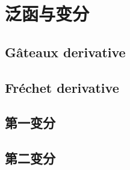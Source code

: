 \section{泛函与变分}
\label{b2:sec:1401}


\subsection{Gâteaux derivative}
\label{b2:subsec:140101}

\subsection{Fréchet derivative}
\label{b2:subsec:140102}

\subsection{第一变分}
\label{b2:subsec:140103}

\subsection{第二变分}
\label{b2:subsec:140104}



